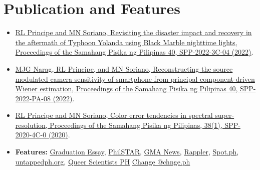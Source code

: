 \documentclass[a4paper,10pt]{article}
\begin{document}
\section{Publication and Features}
 \begin{itemize}

     \item {\href{https://proceedings.spp-online.org/article/view/SPP-2022-3C-04}{RL Principe and MN Soriano, Revisiting the disaster impact and recovery in the aftermath of Typhoon Yolanda using Black Marble nighttime lights, Proceedings of the Samahang Pisika ng Pilipinas 40, SPP-2022-3C-04 (2022)}}.

     \item {\href{https://proceedings.spp-online.org/article/view/SPP-2022-PA-08}{MJG Narag, RL Principe, and MN Soriano, Reconstructing the source modulated camera sensitivity of smartphone from principal component-driven Wiener estimation, Proceedings of the Samahang Pisika ng Pilipinas 40, SPP-2022-PA-08 (2022)}}.
 
     \item {\href{https://proceedings.spp-online.org/article/view/SPP-2020-4C-06}{RL Principe and MN Soriano, Color error tendencies in spectral super-resolution, Proceedings of the Samahang Pisika ng Pilipinas, 38(1), SPP-2020-4C-0 (2020)}}.
     
     \item \textbf{Features:} {\href{https://www.facebook.com/photo?fbid=3443160952384277&set=a.157127907654281}{Graduation Essay}, \href{https://www.facebook.com/PhilippineSTAR/posts/1875491692604503}{PhilSTAR}, \href{https://www.facebook.com/gmanews/photos/a.126333131976/10159088372821977/?type=3&theater}{GMA News}, \href{https://www.facebook.com/rapplerdotcom/photos/a.317154781638645/3660737677280322/?type=3&theater}{Rappler}, \href{https://www.spot.ph/newsfeatures/newsfeatures-peopleparties/83040/interview-with-up-graduate-rene-principe-jr-a833-20200730?utm_source=Facebook-Spot&utm_medium=Ownshare&utm_campaign=20200730-fbnp-newsfeatures-interview-with-up-graduate-rene-principe-jr-a833-20200730-fbfirst&fbclid=IwAR32ERg7TPe8Wn9rBDl_2nc6RREReaKFPjU4JuswTHeipD5KklNGvtThCcQ}{Spot.ph}, \href{https://untappedph.org/blog/pride-in-stem}{untappedph.org}, \href{https://queerscientistsph.medium.com/rene-principe-jr-and-the-spectrum-of-success-6a68d4225290}{Queer Scientists PH}}
     \href{https://www.facebook.com/chnge.ph/posts/344059733642133}{Change @chnge.ph}


\end{itemize}
\end{document}
